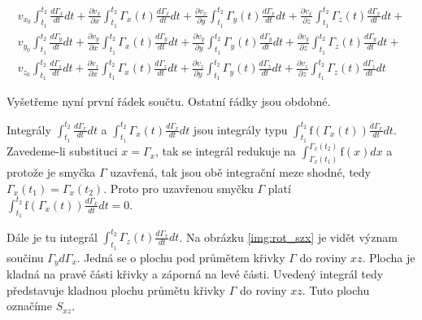 \begin{equation}
\label{eq:rotace_2}
\begin{matrix}
v_{x_0} \int_{t_1}^{t_2} \frac{d \Gamma_x}{dt} dt + \frac{\partial v_x}{\partial x} \int_{t_1}^{t_2} \Gamma_x(t) \frac{d \Gamma_x}{dt} dt + \frac{\partial v_x}{\partial y} \int_{t_1}^{t_2} \Gamma_y(t) \frac{d \Gamma_x}{dt} dt + \frac{\partial v_x}{\partial z} \int_{t_1}^{t_2} \Gamma_z(t) \frac{d \Gamma_x}{dt} dt + \\
v_{y_0} \int_{t_1}^{t_2} \frac{d \Gamma_y}{dt} dt + \frac{\partial v_y}{\partial x} \int_{t_1}^{t_2} \Gamma_x(t) \frac{d \Gamma_y}{dt} dt + \frac{\partial v_y}{\partial y} \int_{t_1}^{t_2} \Gamma_y(t) \frac{d \Gamma_y}{dt} dt + \frac{\partial v_y}{\partial z} \int_{t_1}^{t_2} \Gamma_z(t) \frac{d \Gamma_y}{dt} dt + \\
v_{z_0} \int_{t_1}^{t_2} \frac{d \Gamma_z}{dt} dt + \frac{\partial v_z}{\partial x} \int_{t_1}^{t_2} \Gamma_x(t) \frac{d \Gamma_z}{dt} dt + \frac{\partial v_z}{\partial y} \int_{t_1}^{t_2} \Gamma_y(t) \frac{d \Gamma_z}{dt} dt + \frac{\partial v_z}{\partial z} \int_{t_1}^{t_2} \Gamma_z(t) \frac{d \Gamma_z}{dt} dt
\end{matrix}
\end{equation}

Vyšetřeme nyní první řádek součtu. Ostatní řádky jsou obdobné.

Integrály \(\int_{t_1}^{t_2} \frac{d \Gamma_x}{dt} dt\) a \(\int_{t_1}^{t_2} \Gamma_x(t) \frac{d \Gamma_x}{dt} dt\) jsou integrály typu \(\int_{t_1}^{t_2} \mathrm{f}(\Gamma_x(t)) \frac{d \Gamma_x}{dt} dt\). Zavedeme-li substituci \(x = \Gamma_x\), tak se integrál redukuje na \(\int_{\Gamma_x(t_1)}^{\Gamma_x(t_2)} \mathrm{f}(x) dx\) a protože je smyčka \(\Gamma\) uzavřená, tak jsou obě integrační meze shodné, tedy \(\Gamma_x(t_1) = \Gamma_x(t_2)\). Proto pro uzavřenou smyčku \(\Gamma\) platí \(\int_{t_1}^{t_2} \mathrm{f}(\Gamma_x(t)) \frac{d \Gamma_x}{dt} dt = 0\).

Dále je tu integrál \(\int_{t_1}^{t_2} \Gamma_z(t) \frac{d \Gamma_x}{dt} dt\). Na obrázku \ref{img:rot_szx} je vidět význam součinu \(\Gamma_y d \Gamma_x\). Jedná se o plochu pod průmětem křivky \(\Gamma\) do roviny \(xz\). Plocha je kladná na pravé části křivky a záporná na levé části. Uvedený integrál tedy představuje kladnou plochu průmětu křivky \(\Gamma\) do roviny \(xz\). Tuto plochu označíme \(S_{xz}\).

